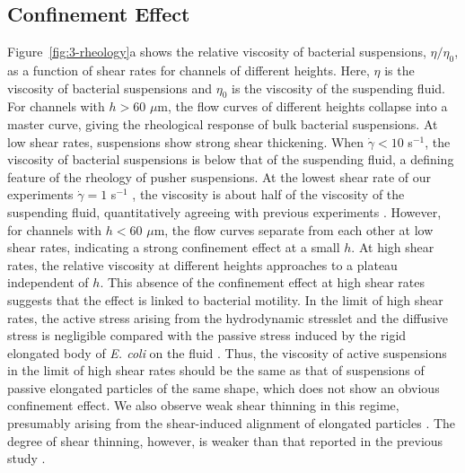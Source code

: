 \subsection{Confinement Effect}
Figure~\ref{fig:3-rheology}a shows the relative viscosity of bacterial suspensions, $\eta/\eta_0$, as a function of shear rates for channels of different heights. Here, $\eta$ is the viscosity of bacterial suspensions and $\eta_0$ is the viscosity of the suspending fluid. For channels with $h > 60$ $\mu$m, the flow curves of different heights collapse into a master curve, giving the rheological response of bulk bacterial suspensions. At low shear rates, suspensions show strong shear thickening. When $\dot\gamma < 10$ s$^{-1}$, the viscosity of bacterial suspensions is below that of the suspending fluid, a defining feature of the rheology of pusher suspensions. At the lowest
shear rate of our experiments $\dot\gamma=1$ s$^{-1}$ , the viscosity is about half of the viscosity of the suspending fluid, quantitatively agreeing with previous experiments \cite{Gachelin2013}. However, for channels with $h < 60$ $\mu$m, the flow curves separate from each other at low shear rates, indicating a strong confinement effect at a small $h$. At high shear rates, the relative viscosity at different heights approaches to a plateau independent of $h$. This absence of the confinement effect at high shear rates suggests that the effect is linked to bacterial motility. In the limit of high shear rates, the active stress arising from the hydrodynamic stresslet and the diffusive stress is negligible compared with the passive stress induced by the rigid elongated body of \textit{E. coli} on the fluid \cite{Takatori2017, Saintillan2018}. Thus, the viscosity of active suspensions in
the limit of high shear rates should be the same as that of suspensions of passive elongated particles of the same shape, which does not show an obvious confinement effect. We also observe weak shear thinning in this regime, presumably arising from the shear-induced alignment of elongated particles \cite{Egres2006}. The degree of shear thinning, however, is weaker than that reported in the previous study \cite{Gachelin2013}.

